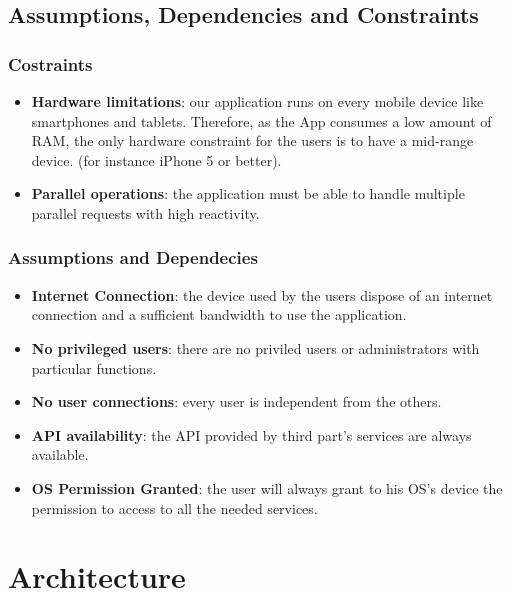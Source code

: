 \documentclass[numbers=noenddot, 12pt, a4paper, oneside]{scrbook}
\begin{document}
\section{Assumptions, Dependencies and Constraints\\}

\subsection*{Costraints}

\begin{itemize}
	\item \textbf{Hardware limitations}: our application runs on every mobile device like smartphones and tablets. Therefore, as the App consumes a low amount of RAM, the only hardware constraint for the users is to have a mid-range device. (for instance iPhone 5 or better).
	\item \textbf{Parallel operations}: the application must be able to handle multiple parallel requests with high reactivity.
\end{itemize}

\subsection*{Assumptions and Dependecies}
\begin{itemize}
	\item \textbf{Internet Connection}: the device used by the users dispose of an internet connection and a sufficient bandwidth to use the application.
	\item \textbf{No privileged users}: there are no priviled users or administrators with particular functions.
	\item \textbf{No user connections}: every user is independent from the others.
	\item \textbf{API availability}: the API provided by third part's services are always available.
	\item \textbf{OS Permission Granted}: the user will always grant to his OS's device the permission to access to all the needed services.
\end{itemize}


\chapter{Architecture}
\end{document}
